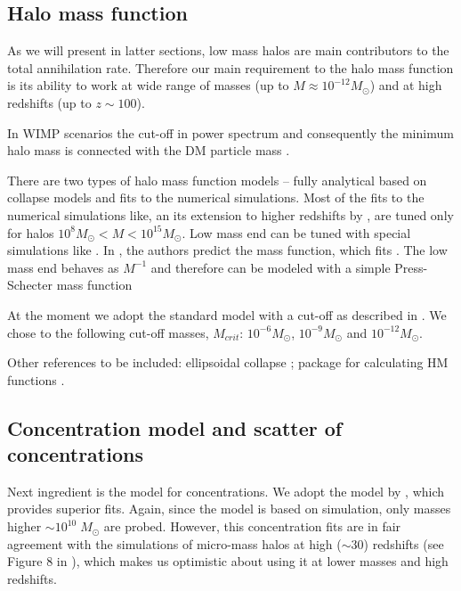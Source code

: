 \subsection{Halo mass function}

As we will present in latter sections, low mass halos are main contributors to the total annihilation rate. Therefore our main requirement to the halo mass function is its ability to work at wide range of masses (up to $M \approx 10^{-12}M_\odot$) and at high redshifts (up to $z \sim 100$). 

In WIMP scenarios the cut-off in power spectrum and consequently the minimum halo mass is connected with the DM particle mass \cite{Green_2004}. 

There are two types of halo mass function models -- fully analytical based on collapse models and fits to the numerical simulations. Most of the fits to the numerical simulations like, \citet{Tinker_2008} an its extension to higher redshifts by \citet{Behroozi_2013}, are tuned only for halos $10^{8}M_\odot < M < 10^{15}M_\odot$. Low mass end can be tuned with special simulations like \citet{Diemand_2005}. In \citet{Schneider_2013}, the authors predict the mass function, which fits \citet{Diemand_2005}. The low mass end behaves as $M^{-1}$ and therefore can be modeled with a simple Press-Schecter mass function \citet{Press_1974}

At the moment we adopt the standard \citet{Press_1974} model with a cut-off as described in \citet{Diemand_2005}. We chose to the following cut-off masses, $M_{crit}$: $10^{-6}M_\odot$, $10^{-9}M_\odot$ and $10^{-12}M_\odot$.

Other references to be included:
ellipsoidal collapse \citep{Sheth_2001}; package for calculating HM functions \cite{Murray_2013}.

\subsection{Concentration model and scatter of concentrations}

Next ingredient is the model for concentrations. We adopt the model by \citet{Diemer_2015}, which provides superior fits. Again, since the model is based on simulation, only masses higher $\sim10^{10}\;M_\odot$ are probed. However, this concentration fits are in fair agreement with the simulations of micro-mass halos at high ($\sim30$) redshifts (see Figure 8 in \citet{Diemer_2015}), which makes us optimistic about using it at lower masses and high redshifts.

